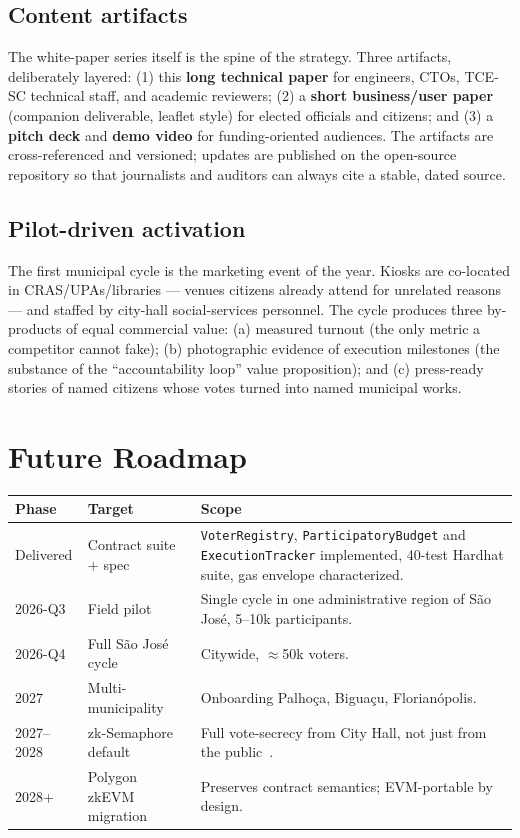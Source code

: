 \documentclass[12pt]{article}
\begin{document}
\subsection{Content artifacts}

The white-paper series itself is the spine of the strategy. Three
artifacts, deliberately layered: (1) this \textbf{long technical paper}
for engineers, CTOs, TCE-SC technical staff, and academic reviewers;
(2) a \textbf{short business/user paper} (companion deliverable, leaflet
style) for elected officials and citizens; and (3) a \textbf{pitch deck}
and \textbf{demo video} for funding-oriented audiences. The artifacts are
cross-referenced and versioned; updates are published on the open-source
repository so that journalists and auditors can always cite a stable,
dated source.

\subsection{Pilot-driven activation}

The first municipal cycle is the marketing event of the year. Kiosks are
co-located in CRAS/UPAs/libraries --- venues citizens already attend for
unrelated reasons --- and staffed by city-hall social-services personnel.
The cycle produces three by-products of equal commercial value:
(a) measured turnout (the only metric a competitor cannot fake);
(b) photographic evidence of execution milestones (the substance of the
``accountability loop'' value proposition); and (c) press-ready stories of
named citizens whose votes turned into named municipal works.

\section{Future Roadmap}
\label{sec:roadmap}

\noindent\begin{tabular}{l l p{}}
\toprule
\textbf{Phase} & \textbf{Target} & \textbf{Scope} \\
\midrule
Delivered & Contract suite + spec & \texttt{VoterRegistry}, \texttt{ParticipatoryBudget} and \texttt{ExecutionTracker} implemented, 40-test Hardhat suite, gas envelope characterized. \\
2026-Q3 & Field pilot & Single cycle in one administrative region of S\~ao Jos\'e, 5--10k participants. \\
2026-Q4 & Full S\~ao Jos\'e cycle & Citywide, \(\approx\)50k voters. \\
2027 & Multi-municipality & Onboarding Palho\c{c}a, Bigua\c{c}u, Florian\'opolis. \\
2027--2028 & zk-Semaphore default & Full vote-secrecy from City Hall, not just from the public~\cite{semaphoredocs}. \\
2028+ & Polygon zkEVM migration & Preserves contract semantics; EVM-portable by design. \\
\bottomrule
\end{tabular}
\end{document}
